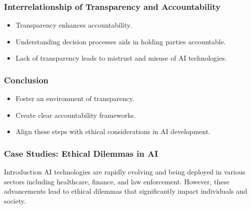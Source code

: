 \documentclass{beamer}
\begin{document}
\begin{frame}[fragile]
    \frametitle{Interrelationship of Transparency and Accountability}
    \begin{itemize}
        \item Transparency enhances accountability.
        \item Understanding decision processes aids in holding parties accountable.
        \item Lack of transparency leads to mistrust and misuse of AI technologies.
    \end{itemize}
\end{frame}

\begin{frame}[fragile]
    \frametitle{Conclusion}
    \begin{itemize}
        \item Foster an environment of transparency.
        \item Create clear accountability frameworks.
        \item Align these steps with ethical considerations in AI development.
    \end{itemize}
\end{frame}

\begin{frame}[fragile]
    \frametitle{Case Studies: Ethical Dilemmas in AI}
    \begin{block}{Introduction}
        AI technologies are rapidly evolving and being deployed in various sectors including healthcare, finance, and law enforcement. However, these advancements lead to ethical dilemmas that significantly impact individuals and society. 
    \end{block}
\end{frame}
\end{document}
